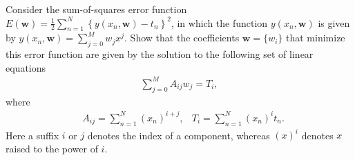 \begin{question}{1.1}
	Consider the sum-of-squares error function $E(\bm{w})=\frac{1}{2}\sum_{n=1}^{N} \left\{ y(x_n, \bm{w}) - t_n\right\}^2$, in which the function $y(x_n, \bm{w})$ is given by $y(x_n, \bm{w}) = \sum_{j = 0}^{M}w_j x^j$. Show that the coefficients $\bm{w}=\{w_i\}$ that minimize this error function are given by the solution to the following set of linear equations
	\begin{align*}
		\sum_{j = 0}^{M} A_{ij}w_j = T_i,
	\end{align*}
	where
	\begin{align*}
		&A_{ij} = \sum_{n=1}^{N} (x_n)^{i+j}, &T_i = \sum_{n=1}^{N}(x_n)^i t_n.
	\end{align*}%
	Here a suffix $i$ or $j$ denotes the index of a component, whereas $(x)^i$ denotes $x$ raised to the power of $i$.
\end{question}


